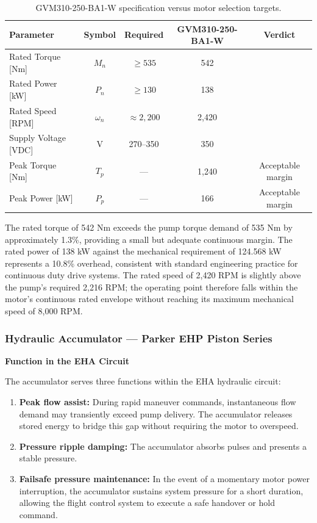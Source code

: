 \documentclass[
bindingoffset=5mm,  %
footnoteindent=3mm, %
hyphenation=true    %
]{src/wut-thesis}
\begin{document}
	\begin{table}[htbp]
		\centering
		\begin{tabular}{l c c c c}
			\toprule
			Parameter & Symbol&Required & GVM310-250-BA1-W & Verdict \\
			\midrule
			Rated Torque [Nm]& $M_n$  & $\geq 535$ & 542 & \checkmark \\
			Rated Power [kW] &$P_n$  & $\geq 130$ & 138 & \checkmark \\
			Rated Speed  [RPM] &$\omega_{n}$  & $\approx 2{,}200$ & 2{,}420 & \checkmark \\
			Supply Voltage [VDC] & V & 270--350 & 350 & \checkmark \\
			Peak Torque [Nm] & $T_p$  & --- & 1{,}240 & Acceptable margin \\
			Peak Power [kW] &$P_p$  & --- & 166 & Acceptable margin \\
			\bottomrule
		\end{tabular}
		\caption{GVM310-250-BA1-W specification versus motor selection targets.\cite{parker_gvm310}}
		\label{table:motor_selection}
	\end{table}
	
	The rated torque of 542 Nm exceeds the pump torque demand of 535 Nm by approximately 1.3\%, providing a small but adequate continuous margin. The rated power of 138 kW against the mechanical requirement of 124.568 kW represents a 10.8\% overhead, consistent with standard engineering practice for continuous duty drive systems. The rated speed of 2,420 RPM is slightly above the pump's required 2,216 RPM; the operating point therefore falls within the motor's continuous rated envelope without reaching its maximum mechanical speed of 8,000 RPM.
	
	\subsubsection{Hydraulic Accumulator — Parker EHP Piston Series}
	
	\textbf{Function in the EHA Circuit}
	
	The accumulator serves three functions within the EHA hydraulic circuit:
	
	\begin{enumerate}
		\item \textbf{Peak flow assist:} During rapid maneuver commands, instantaneous flow demand may transiently exceed pump delivery. The accumulator releases stored energy to bridge this gap without requiring the motor to overspeed.
		\item \textbf{Pressure ripple damping:} The accumulator absorbs pulses and presents a stable pressure.
		\item \textbf{Failsafe pressure maintenance:} In the event of a momentary motor power interruption, the accumulator sustains system pressure for a short duration, allowing the flight control system to execute a safe handover or hold command.
	\end{enumerate}
	
\end{document}
